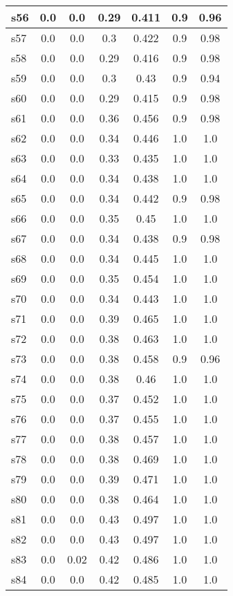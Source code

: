 \documentclass{article}
\begin{document}
\begin{tabular}{|l|c|c|c|c|c|c|}
\hline
s56 &0.0 & 0.0 & 0.29 & 0.411 & 0.9 & 0.96\\
\hline
s57 &0.0 & 0.0 & 0.3 & 0.422 & 0.9 & 0.98\\
\hline
s58 &0.0 & 0.0 & 0.29 & 0.416 & 0.9 & 0.98\\
\hline
s59 &0.0 & 0.0 & 0.3 & 0.43 & 0.9 & 0.94\\
\hline
s60 &0.0 & 0.0 & 0.29 & 0.415 & 0.9 & 0.98\\
\hline
s61 &0.0 & 0.0 & 0.36 & 0.456 & 0.9 & 0.98\\
\hline
s62 &0.0 & 0.0 & 0.34 & 0.446 & 1.0 & 1.0\\
\hline
s63 &0.0 & 0.0 & 0.33 & 0.435 & 1.0 & 1.0\\
\hline
s64 &0.0 & 0.0 & 0.34 & 0.438 & 1.0 & 1.0\\
\hline
s65 &0.0 & 0.0 & 0.34 & 0.442 & 0.9 & 0.98\\
\hline
s66 &0.0 & 0.0 & 0.35 & 0.45 & 1.0 & 1.0\\
\hline
s67 &0.0 & 0.0 & 0.34 & 0.438 & 0.9 & 0.98\\
\hline
s68 &0.0 & 0.0 & 0.34 & 0.445 & 1.0 & 1.0\\
\hline
s69 &0.0 & 0.0 & 0.35 & 0.454 & 1.0 & 1.0\\
\hline
s70 &0.0 & 0.0 & 0.34 & 0.443 & 1.0 & 1.0\\
\hline
s71 &0.0 & 0.0 & 0.39 & 0.465 & 1.0 & 1.0\\
\hline
s72 &0.0 & 0.0 & 0.38 & 0.463 & 1.0 & 1.0\\
\hline
s73 &0.0 & 0.0 & 0.38 & 0.458 & 0.9 & 0.96\\
\hline
s74 &0.0 & 0.0 & 0.38 & 0.46 & 1.0 & 1.0\\
\hline
s75 &0.0 & 0.0 & 0.37 & 0.452 & 1.0 & 1.0\\
\hline
s76 &0.0 & 0.0 & 0.37 & 0.455 & 1.0 & 1.0\\
\hline
s77 &0.0 & 0.0 & 0.38 & 0.457 & 1.0 & 1.0\\
\hline
s78 &0.0 & 0.0 & 0.38 & 0.469 & 1.0 & 1.0\\
\hline
s79 &0.0 & 0.0 & 0.39 & 0.471 & 1.0 & 1.0\\
\hline
s80 &0.0 & 0.0 & 0.38 & 0.464 & 1.0 & 1.0\\
\hline
s81 &0.0 & 0.0 & 0.43 & 0.497 & 1.0 & 1.0\\
\hline
s82 &0.0 & 0.0 & 0.43 & 0.497 & 1.0 & 1.0\\
\hline
s83 &0.0 & 0.02 & 0.42 & 0.486 & 1.0 & 1.0\\
\hline
s84 &0.0 & 0.0 & 0.42 & 0.485 & 1.0 & 1.0\\

\end{tabular}
\end{document}
